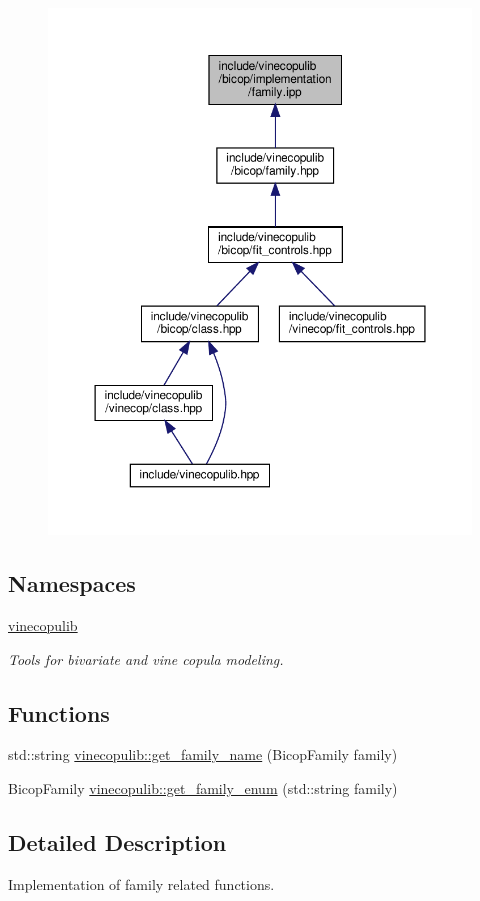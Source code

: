 \begin{figure}[H]
\begin{center}
\leavevmode
\includegraphics[width=350pt]{family_8ipp__dep__incl}
\end{center}
\end{figure}
\subsection*{Namespaces}
\begin{DoxyCompactItemize}
\item 
 \hyperlink{namespacevinecopulib}{vinecopulib}
\begin{DoxyCompactList}\small\item\em Tools for bivariate and vine copula modeling. \end{DoxyCompactList}\end{DoxyCompactItemize}
\subsection*{Functions}
\begin{DoxyCompactItemize}
\item 
std\+::string \hyperlink{namespacevinecopulib_ac46553ae5f99072f65e9d3254d2c526d}{vinecopulib\+::get\+\_\+family\+\_\+name} (Bicop\+Family family)
\item 
Bicop\+Family \hyperlink{namespacevinecopulib_a8d5285a58e0d250a5226715754e12568}{vinecopulib\+::get\+\_\+family\+\_\+enum} (std\+::string family)
\end{DoxyCompactItemize}


\subsection{Detailed Description}
Implementation of family related functions. 

